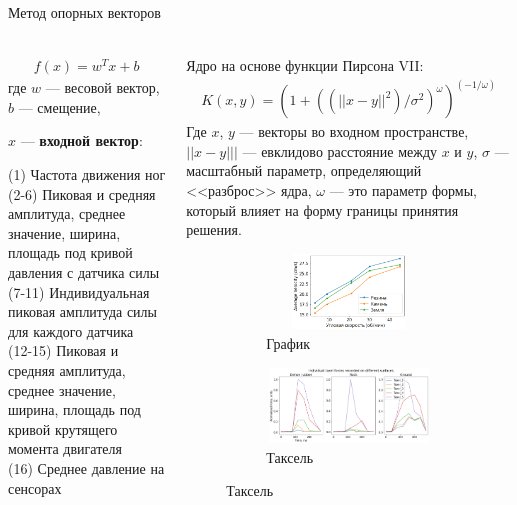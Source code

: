 \begin{frame}[t]{Метод опорных векторов}
\framesubtitle{}
\small
\begin{columns}[T,onlytextwidth]
    \begin{column}{0.49\textwidth}
        \vspace{-0.5cm}
        \begin{align}
            f(x) = w^T x + b
        \end{align}
        где $w$ --- весовой вектор, $b$ --- смещение,

        $x$ --- \textbf{входной вектор}:

        (1) Частота движения ног\\
        (2-6) Пиковая и средняя амплитуда, среднее значение, ширина, площадь под кривой давления с датчика силы\\
        (7-11) Индивидуальная пиковая амплитуда силы для каждого датчика\\
        (12-15) Пиковая и средняя амплитуда, среднее значение, ширина, площадь под кривой  крутящего момента двигателя\\
        (16) Среднее давление на сенсорах
    \end{column}
    \begin{column}{0.49\textwidth}
        Ядро на основе функции Пирсона VII:
\begin{align}
    K(x, y) = (1 + ((||x - y||^2)/\sigma^2)^\omega)^{(-1/\omega)}
\end{align}
Где $x$, $y$ --- векторы во входном пространстве, $||x - y|||$ --- евклидово расстояние между $x$ и $y$, $\sigma$ --- масштабный параметр, определяющий <<разброс>> ядра, $\omega$ --- это параметр формы, который влияет на форму границы принятия решения.

\begin{figure}[H]
    \begin{subfigure}{0.49\textwidth}
        \centering\includegraphics[height=2cm,width=1\textwidth,keepaspectratio]{../images/s_shape_leg/avg_lin_vel_rev_min.png}
        \caption{График}
    \end{subfigure}
    \begin{subfigure}{0.49\textwidth}
        \centering\includegraphics[height=2cm,width=1\textwidth,keepaspectratio]{../images/s_shape_leg/TaxelIndForce.png}
        \caption{Таксель}
    \end{subfigure}
\end{figure}
    \end{column}
\end{columns}
\end{frame}

